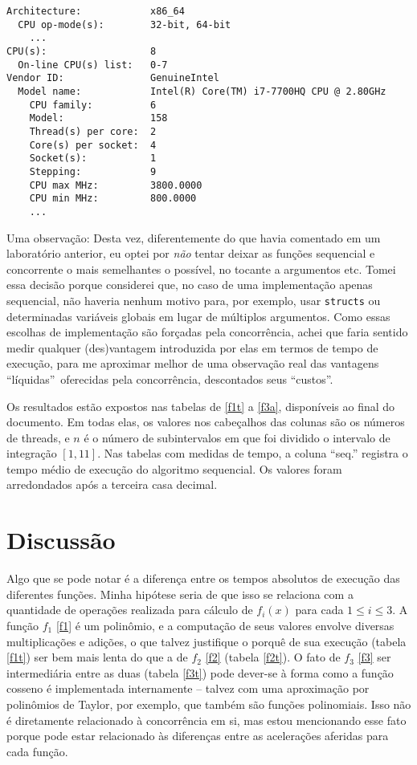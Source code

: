\documentclass{article}
\begin{document}
\begin{lstlisting}
Architecture:            x86_64
  CPU op-mode(s):        32-bit, 64-bit
    ...
CPU(s):                  8
  On-line CPU(s) list:   0-7
Vendor ID:               GenuineIntel
  Model name:            Intel(R) Core(TM) i7-7700HQ CPU @ 2.80GHz
    CPU family:          6
    Model:               158
    Thread(s) per core:  2
    Core(s) per socket:  4
    Socket(s):           1
    Stepping:            9
    CPU max MHz:         3800.0000
    CPU min MHz:         800.0000
    ...
\end{lstlisting}

  Uma observação: Desta vez, diferentemente do que havia comentado em um laboratório anterior, eu optei por \emph{não} tentar deixar as funções sequencial e concorrente o mais semelhantes o possível, no tocante a argumentos etc. Tomei essa decisão porque considerei que, no caso de uma implementação apenas sequencial, não haveria nenhum motivo para, por exemplo, usar \texttt{structs} ou determinadas variáveis globais em lugar de múltiplos argumentos. Como essas escolhas de implementação são forçadas pela concorrência, achei 
  que faria sentido medir qualquer (des)vantagem introduzida por elas 
  em termos de tempo de execução, para me aproximar melhor de uma 
  observação real das vantagens ``líquidas''\ oferecidas pela concorrência, descontados seus ``custos''.

  Os resultados estão expostos nas tabelas de \ref{f1t} a \ref{f3a}, disponíveis ao final do documento. Em todas elas, os valores nos cabeçalhos das colunas são os números de threads, e $n$ é o número de subintervalos em que foi dividido o intervalo de integração $[1, 11]$. Nas tabelas com medidas de tempo, a coluna ``seq.'' registra o tempo médio de execução do algoritmo sequencial. Os valores foram arredondados após a terceira casa decimal.

  \section{Discussão} \label{disc}

  Algo que se pode notar é a diferença entre os tempos absolutos de execução das diferentes funções. Minha hipótese seria de que isso se relaciona com a quantidade de operações realizada para cálculo de $f_i(x)$ para cada $1 \leq i \leq 3$. A função $f_1$ \eqref{f1} é um polinômio, e a computação de seus valores envolve diversas multiplicações e adições, o que talvez justifique o porquê de sua execução (tabela \ref{f1t}) ser bem mais lenta do que a de $f_2$ \eqref{f2} (tabela \ref{f2t}). O fato de $f_3$ \eqref{f3} ser intermediária entre as duas (tabela \ref{f3t}) pode dever-se à forma como a função cosseno é implementada internamente -- talvez com uma aproximação por polinômios de Taylor, por exemplo, que também são funções polinomiais. Isso não é diretamente relacionado à concorrência em si, mas estou mencionando esse fato porque pode estar relacionado às diferenças entre as acelerações aferidas para cada função.
\end{document}
